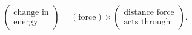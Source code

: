\documentclass[14pt,preview]{standalone}
\begin{document}
\begin{preview}
\begin{equation}
\tag{Eq:I:4:4}

\begin{pmatrix}
\text{change in}\\
\text{energy}
\end{pmatrix}=
(\text{force})\times

\begin{pmatrix}
\text{distance force}\\
\text{acts through}
\end{pmatrix}.
\end{equation}
\end{preview}
\end{document}

